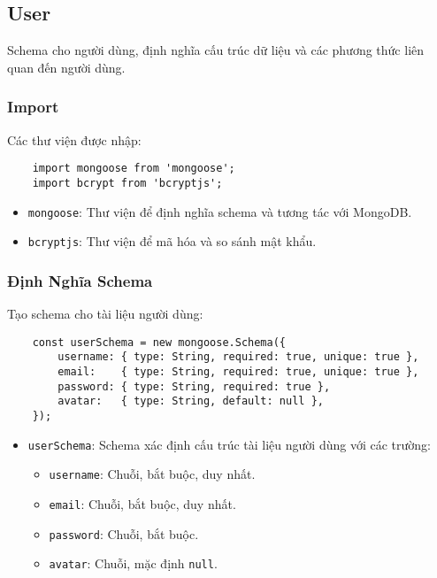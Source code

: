         \subsection{User}
            \hspace*{0.6cm}Schema cho người dùng, định nghĩa cấu trúc dữ liệu và các phương thức liên quan đến người dùng.
            \subsubsection{Import}
                \hspace*{0.6cm}Các thư viện được nhập:
                \begin{lstlisting}
    import mongoose from 'mongoose';
    import bcrypt from 'bcryptjs';
                \end{lstlisting}
                \begin{itemize}
                    \item \texttt{mongoose}: Thư viện để định nghĩa schema và tương tác với MongoDB.
                    \item \texttt{bcryptjs}: Thư viện để mã hóa và so sánh mật khẩu.
                \end{itemize}

            \subsubsection{Định Nghĩa Schema}
                \hspace*{0.6cm}Tạo schema cho tài liệu người dùng:
    \begin{lstlisting}
    const userSchema = new mongoose.Schema({
        username: { type: String, required: true, unique: true },
        email:    { type: String, required: true, unique: true },
        password: { type: String, required: true },
        avatar:   { type: String, default: null },
    });
                \end{lstlisting}
                \begin{itemize}
                    \item \texttt{userSchema}: Schema xác định cấu trúc tài liệu người dùng với các trường:
                    \begin{itemize}
                        \item \texttt{username}: Chuỗi, bắt buộc, duy nhất.
                        \item \texttt{email}: Chuỗi, bắt buộc, duy nhất.
                        \item \texttt{password}: Chuỗi, bắt buộc.
                        \item \texttt{avatar}: Chuỗi, mặc định \texttt{null}.
                    \end{itemize}
                \end{itemize}

